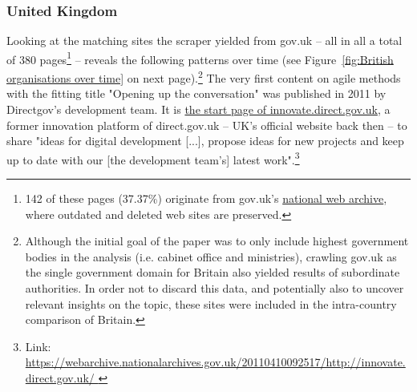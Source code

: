 \subsubsection{United Kingdom} 
Looking at the matching sites the scraper yielded from gov.uk – all in all a total of 380 pages\footnote{142 of these pages (37.37\%) originate from gov.uk's \href{https://webarchive.nationalarchives.gov.uk/search/}{national web archive}, where outdated and deleted web sites are preserved.} – reveals the following patterns over time (see Figure~\ref{fig:British organisations over time} on next page).\footnote{Although the initial goal of the paper was to only include highest government bodies in the analysis (i.e. cabinet office and ministries), crawling gov.uk as the single government domain for Britain also yielded results of subordinate authorities. In order not to discard this data, and potentially also to uncover relevant insights on the topic, these sites were included in the intra-country comparison of Britain.} The very first content on agile methods with the fitting title "Opening up the conversation" was published in 2011 by Directgov's development team. It is \href{https://webarchive.nationalarchives.gov.uk/20110410092517/http://innovate.direct.gov.uk/
}{the start page of innovate.direct.gov.uk}, a former innovation platform of direct.gov.uk – UK's official website back then – to share "ideas for digital development [...], propose ideas for new projects and keep up to date with our [the development team's] latest work".\footnote{Link: \url{https://webarchive.nationalarchives.gov.uk/20110410092517/http://innovate.direct.gov.uk/
}}
